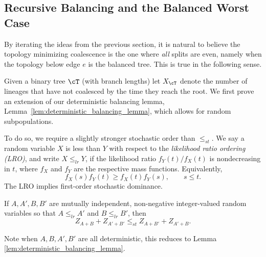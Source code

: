 \subsection{Recursive Balancing and the Balanced Worst Case}
\label{sec:recursive-balancing}

By iterating the ideas from the previous section, it is natural to believe the topology
minimizing coalescence is the one where \textit{all} splits are even, namely when the
topology below edge $e$ is the balanced tree. This is true in the following sense.

Given a binary tree $\cT$ (with branch lengths) let $X_\cT$ denote the number of
lineages that have not coalesced by the time they reach the root. We first prove
an extension of our deterministic balancing lemma,
Lemma~\ref{lem:deterministic_balancing_lemma}, which allows
for random subpopulations.

To do so, we require a slightly stronger stochastic order than $\leq_{st}$. We say a random variable $X$ is less than $Y$ with respect to the
\emph{likelihood ratio ordering (LRO)}, and write $X\leq_{lr}Y$, if the
likelihood ratio $f_Y(t)/f_X(t)$ is nondecreasing in $t$, where $f_X$ and
$f_Y$ are the respective mass functions. Equivalently,
\[
f_X(s)f_Y(t) \geq f_X(t)f_Y(s), \qquad s\leq t.
\]
The LRO implies first-order stochastic dominance.

\begin{lemma}
\label{lem:balancing_lemma}
If $A,A', B, B'$ are mutually independent, non-negative integer-valued random variables
so that $A \leq_{lr} A'$ and $B \leq_{lr} B'$, then
%
\[Z_{A + B} + Z_{A' + B'} \leq_{st} Z_{A + B'} + Z_{A' + B}. \]
\end{lemma}
%
\noindent Note when $A,B,A', B'$ are all deterministic, this reduces to Lemma \ref{lem:deterministic_balancing_lemma}.

